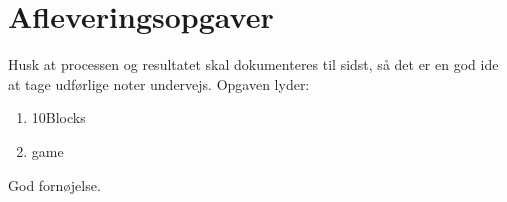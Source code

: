 \documentclass[a4paper,12pt]{article}
\newcommand{\typeLetter}{g}
\begin{document}
\section*{Afleveringsopgaver}
Husk at processen og resultatet skal dokumenteres til sidst, så det er en god ide at tage udførlige noter undervejs. Opgaven lyder:
\begin{enumerate}[label=\theexerciseNumber  \typeLetter.\arabic*,start=0]
\item {10Blocks}
\item {game}
\end{enumerate}

\handinTextOne

\flushright God fornøjelse.
\end{document}
